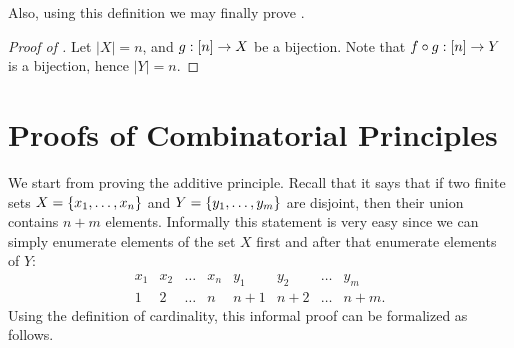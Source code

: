 Also, using this definition we may finally prove
.
\begin{proof}[Proof of ]
    Let $|X| = n$, and $g : {[{n}]} \to X$ be a bijection.
    Note that $f \circ g : {[{n}]} \to Y$ is a bijection, hence $|Y| = n$.
\end{proof}

\section{Proofs of Combinatorial Principles}
We start from proving the additive principle. Recall that it says that if two
finite sets $X = \set{x_1, \dots, x_n}$ and $Y = \set{y_1, \dots, y_m}$ are
disjoint, then their union contains $n + m$ elements. Informally this statement
is very easy since we can simply enumerate elements of the set $X$ first and
after that enumerate elements of $Y$:
\[
  \begin{matrix}
    x_1 & x_2 & \dots & x_n & y_1    & y_2   & \dots & y_m \\
    1   & 2   & \dots & n   & n + 1  & n + 2 & \dots & n + m.
  \end{matrix}
\]
Using the definition of cardinality, this informal proof can be formalized as
follows. 
